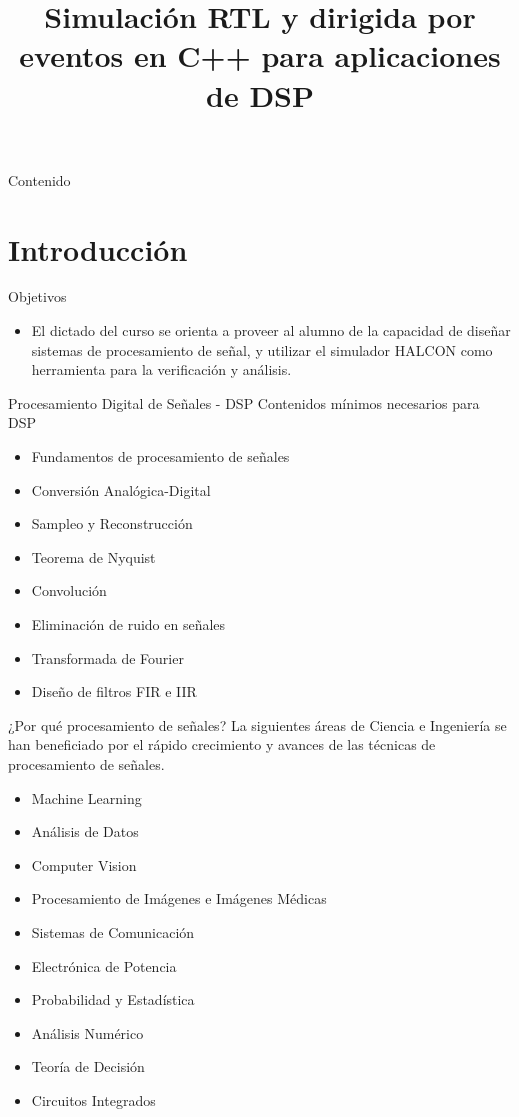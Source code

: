 \documentclass[11pt]{beamer}
\title{Simulación RTL y dirigida por eventos en C++ para aplicaciones de DSP}
\institute[]{Instituto Balseiro \par Centro Atómico Bariloche}
\date{}
\begin{document}
	
	\begin{frame}
		\titlepage
	\end{frame}
	
	\begin{frame}{Contenido}
		\tableofcontents 
	\end{frame}
	
	\section{Introducción}
	
	\begin{frame}{Objetivos}
		\begin{itemize}
			\item El dictado del curso se orienta a proveer al alumno de la capacidad de diseñar sistemas de procesamiento de señal, y utilizar el simulador HALCON como herramienta para la verificación y análisis.
		\end{itemize}

	\end{frame}
	
	\begin{frame}{Procesamiento Digital de Señales - DSP}
	Contenidos mínimos necesarios para DSP	\newline
	\begin{itemize}
		\item Fundamentos de procesamiento de señales
		\item Conversión Analógica-Digital
		\item Sampleo y Reconstrucción
		\item Teorema de Nyquist
		\item Convolución
		\item Eliminación de ruido en señales
		\item Transformada de Fourier
		\item Diseño de filtros FIR e IIR 		
	\end{itemize}
	\end{frame}
	
	\begin{frame}{¿Por qué procesamiento de señales?}
	La siguientes áreas de Ciencia e Ingeniería	se han beneficiado por el rápido crecimiento y avances de las técnicas de procesamiento de señales. 
	\vspace{0.2cm}
	\begin{itemize}
		\item Machine Learning
		\item Análisis de Datos
		\item Computer Vision
		\item Procesamiento de Imágenes e Imágenes Médicas
		\item Sistemas de Comunicación
		\item Electrónica de Potencia
		\item Probabilidad y Estadística
		\item Análisis Numérico
		\item Teoría de Decisión
		\item Circuitos Integrados
	\end{itemize}
	\end{frame}
	
\end{document}
